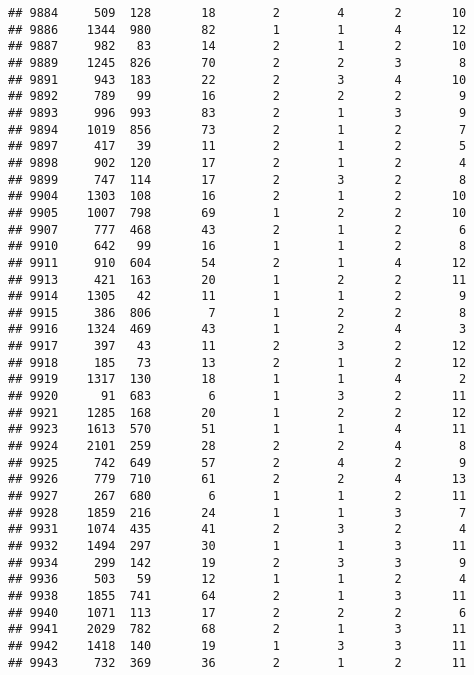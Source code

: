 \documentclass[]{article}
\begin{document}
\begin{verbatim}
## 9884     509  128       18        2        4       2       10
## 9886    1344  980       82        1        1       4       12
## 9887     982   83       14        2        1       2       10
## 9889    1245  826       70        2        2       3        8
## 9891     943  183       22        2        3       4       10
## 9892     789   99       16        2        2       2        9
## 9893     996  993       83        2        1       3        9
## 9894    1019  856       73        2        1       2        7
## 9897     417   39       11        2        1       2        5
## 9898     902  120       17        2        1       2        4
## 9899     747  114       17        2        3       2        8
## 9904    1303  108       16        2        1       2       10
## 9905    1007  798       69        1        2       2       10
## 9907     777  468       43        2        1       2        6
## 9910     642   99       16        1        1       2        8
## 9911     910  604       54        2        1       4       12
## 9913     421  163       20        1        2       2       11
## 9914    1305   42       11        1        1       2        9
## 9915     386  806        7        1        2       2        8
## 9916    1324  469       43        1        2       4        3
## 9917     397   43       11        2        3       2       12
## 9918     185   73       13        2        1       2       12
## 9919    1317  130       18        1        1       4        2
## 9920      91  683        6        1        3       2       11
## 9921    1285  168       20        1        2       2       12
## 9923    1613  570       51        1        1       4       11
## 9924    2101  259       28        2        2       4        8
## 9925     742  649       57        2        4       2        9
## 9926     779  710       61        2        2       4       13
## 9927     267  680        6        1        1       2       11
## 9928    1859  216       24        1        1       3        7
## 9931    1074  435       41        2        3       2        4
## 9932    1494  297       30        1        1       3       11
## 9934     299  142       19        2        3       3        9
## 9936     503   59       12        1        1       2        4
## 9938    1855  741       64        2        1       3       11
## 9940    1071  113       17        2        2       2        6
## 9941    2029  782       68        2        1       3       11
## 9942    1418  140       19        1        3       3       11
## 9943     732  369       36        2        1       2       11

\end{verbatim}
\end{document}
